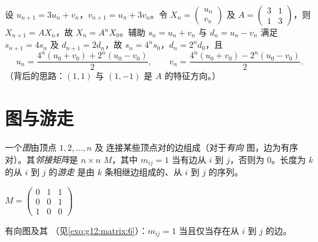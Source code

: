 \begin{example}[耦合数列]\label{ex:g12:matrix:coupled}
设 $u_{n+1} = 3u_n + v_n$，$v_{n+1} = u_n + 3v_n$。令
$X_n = \begin{pmatrix} u_n\\ v_n \end{pmatrix}$ 及
$A = \begin{pmatrix} 3 & 1\\ 1 & 3\end{pmatrix}$，则
$X_{n+1} = AX_n$，故 $X_n = A^n X_0$。辅助
$s_n = u_n + v_n$ 与 $d_n = u_n - v_n$ 满足 $s_{n+1} = 4s_n$ 及
$d_{n+1} = 2d_n$，故 $s_n = 4^n s_0$，$d_n = 2^n d_0$，且
\[
u_n = \frac{4^n(u_0+v_0) + 2^n(u_0-v_0)}{2}, \qquad
v_n = \frac{4^n(u_0+v_0) - 2^n(u_0-v_0)}{2}.
\]
（背后的思路：$(1,1)$ 与 $(1,-1)$ 是 $A$ 的特征方向。）
\end{example}

\section{图与游走}

\begin{definition}[图、邻接矩阵]\label{def:g12:matrix:graph}
一个\emph{图}由顶点 $1, 2, \dots, n$ 及
连接某些顶点对的边组成（对于\emph{有向}
图，边为有序对）。其\emph{邻接矩阵}是
$n \times n$  $M$，其中 $m_{ij} = 1$ 当有边从 $i$ 到
$j$，否则为 $0$。长度为 $k$ 的从 $i$ 到 $j$ 的\emph{游走}
是由 $k$ 条相继边组成的、从 $i$ 到 $j$ 的序列。
\end{definition}

\begin{omfigure}
\qquad\qquad
$M = \begin{pmatrix} 0 & 1 & 1\\ 0 & 0 & 1\\ 1 & 0 & 0 \end{pmatrix}$

{\small 有向图及其
（见\cref{exo:g12:matrix:6}）：$m_{ij} = 1$ 当且仅当存在从 $i$ 到
$j$ 的边。}
\end{omfigure}

